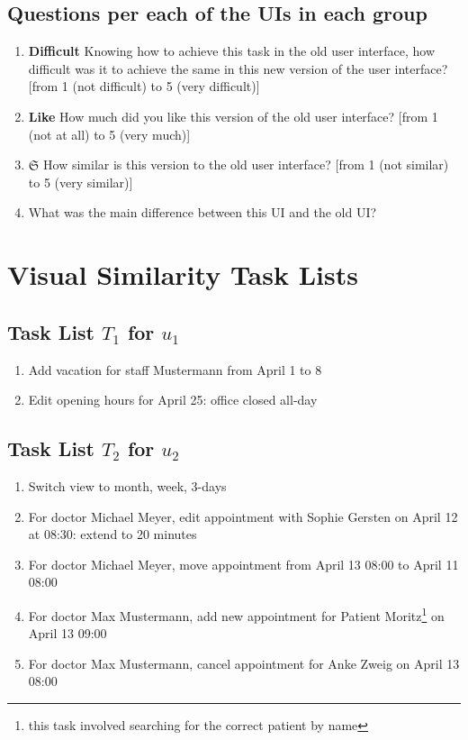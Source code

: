 \begin{appendix}
\subsection*{Questions per each of the UIs in each group}
\begin{enumerate}
\item \textbf{Difficult} Knowing how to achieve this task in the old user interface, how difficult was it to achieve the same in this new version of the user interface? [from 1 (not difficult) to 5 (very difficult)]
\item \textbf{Like} How much did you like this version of the old user interface? [from 1 (not at all) to 5 (very much)]
\item \textbf{\(\bm{\mathfrak{S}}\)} How similar is this version to the old user interface? [from 1 (not similar) to 5 (very similar)]
\item What was the main difference between this UI and the old UI?
\end{enumerate}

\vspace{-15pt}
\section{Visual Similarity Task Lists\label{sec:ci-tasks}}
\vspace{15pt}

\subsection*{Task List \(T_1\) for \(u_1\)}
\begin{enumerate}[start=1,label={\(t_{1,\arabic*}\)}]
\item Add vacation for staff Mustermann from April 1 to 8
\item Edit opening hours for April 25: office closed all-day
\end{enumerate}

\subsection*{Task List \(T_2\) for \(u_2\)}
\begin{enumerate}[start=1,label={\(t_{2,\arabic*}\)}]
\item Switch view to month, week, 3-days
\item For doctor Michael Meyer, edit appointment with Sophie Gersten on April 12 at 08:30: extend to 20 minutes
\item For doctor Michael Meyer, move appointment from April 13 08:00 to April 11 08:00
\item For doctor Max Mustermann, add new appointment for Patient Moritz\footnote{this task involved searching for the correct patient by name} on April 13 09:00
\item For doctor Max Mustermann, cancel appointment for Anke Zweig on April 13 08:00
\end{enumerate}


\end{appendix}
